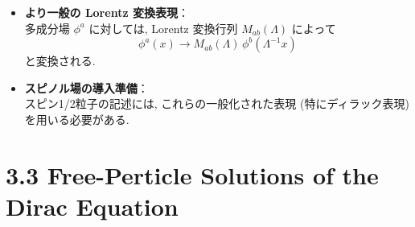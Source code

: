 \documentclass[a4paper,12pt]{article}
\begin{document}
\begin{itemize}
  \item \textbf{より一般の Lorentz 変換表現}：\\
  多成分場 $\phi^a$ に対しては, Lorentz 変換行列 $M_{ab}(\Lambda)$ によって
  \begin{equation*}
    \phi^a(x) \to M_{ab}(\Lambda)\, \phi^b(\Lambda^{-1}x)
  \end{equation*}
  と変換される.

  \item \textbf{スピノル場の導入準備}：\\
  スピン1/2粒子の記述には, これらの一般化された表現 (特にディラック表現) を用いる必要がある.
\end{itemize}
\newpage
\color{black}
\section*{3.3 Free-Perticle Solutions of the Dirac Equation}
\end{document}
